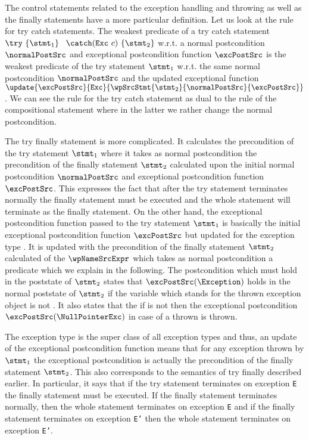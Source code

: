 The control statements related to the exception handling and throwing as well as the finally statements
 have a more particular definition. 
Let us look at the rule for \textsf{try catch} statements.
 The weakest predicate of a try catch statement $ \try \ \{ \stmt_1 \} \ $ 
$\catch (  \mbox{\rm\texttt{Exc}} \ c )\ \{ \stmt_2 \} $  w.r.t. a normal postcondition   $\normalPostSrc$  and exceptional postcondition function $ \excPostSrc$
is the weakest predicate of the try statement $\stmt_1$ w.r.t. the same normal postcondition  $\normalPostSrc$  and the updated exceptional function
$\update{\excPostSrc}{ \mbox{\rm\texttt{Exc}} }{\wpSrcStmt{\stmt_2}{ \normalPostSrc}{\excPostSrc} }$. We can see the rule for the 
\textsf{try catch} statement as  dual to the rule of the  compositional statement where in the latter we rather change the normal postcondition. 
 

The  \textsf{try finally} statement is more complicated. It calculates the precondition of the try statement $\stmt_1$ where it takes as normal postcondition
the precondition of the finally statement $\stmt_2$  calculated upon the initial normal postcondition $\normalPostSrc$ and exceptional postcondition function
 $\excPostSrc$. This expresses the fact that after the try statement terminates normally the finally statement must be executed and the whole statement will terminate 
as the finally statement. 
On the other hand, the exceptional postcondition function passed to the try statement $\stmt_1$ is basically the initial exceptional postcondition function $\excPostSrc$ but updated for the exception
type \Exception{}. It is updated 
 with the precondition of the finally statement $\stmt_2$ calculated of the $\wpNameSrcExpr$ which takes as normal postcondition a predicate which we explain in the following.
The postcondition which must hold in the poststate of  $\stmt_2$  states that   $\excPostSrc(\Exception)$ holds in the normal poststate of $\stmt_2$ if the variable
\EXC{} which stands for the thrown exception object is not \Mynull. It also states that the if \EXC{} is not \Mynull then the exceptional
postcondition  $\excPostSrc(\NullPointerExc)$ in case of a thrown \NullPointerExc{} is thrown.

 The exception type \Exception{} is the super class of all exception types and thus, 
an update of the exceptional postcondition function 
means that for any exception thrown by $\stmt_1$ the exceptional postcondition is actually the precondition of the finally statement $\stmt_2$.
 This also 
corresponds to the semantics of \textsf{try finally}  described earlier. In particular, it says that if the try statement terminates on exception \texttt{E}
the finally statement must be executed. If the finally statement terminates normally, then the  whole statement terminates on exception \texttt{E} and if the finally statement
terminates on exception  \texttt{E'} then the  whole statement terminates on exception \texttt{E'}.
